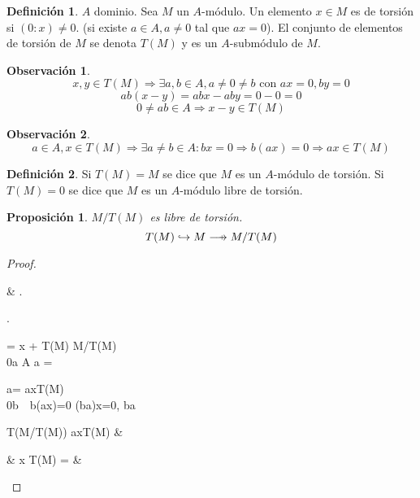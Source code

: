 \documentclass{article}
\def\flechaSobreyectiva{\mathrel{\mkern16mu  \vcenter{\hbox{$\scriptscriptstyle+$}}%
		\mkern-25mu{\longrightarrow}}}
\newenvironment{rcases}
{\left.\begin{aligned}}
	{\end{aligned}\right\rbrace}
\theoremstyle{theorem-style}  %
\newtheorem{proposition}[theorem]{Proposición}
\theoremstyle{definition}
\newtheorem{definition}{Definición}[section]
\newtheorem*{observation}{Observación} %
\theoremstyle{example-style}
\begin{document}
	\begin{definition}
		$ A $ dominio. Sea $ M$ un $ A $-módulo. Un elemento $ x\in M $ es de torsión si $ (0:x)\neq 0 $.
		(si existe $ a\in A, a \neq 0 $ tal que $ ax=0 $).
		El conjunto de elementos de torsión de $ M $ se denota $ T(M) $ y es un $ A $-submódulo de $ M $.
	\end{definition}

	\begin{observation}
		\[x,y\in T(M) \Rightarrow \exists a,b \in A, a\neq 0\neq b \text{ con } ax=0, by=0\]
		\[ ab(x-y)=abx-aby=0-0=0\]
		\[0\neq ab \in A \Rightarrow x-y \in T(M)\]
	\end{observation}

	\begin{observation}
	\[ a \in A, x \in T(M) \Rightarrow \exists a\neq b \in A : bx=0 \Rightarrow b(ax)=0 \Rightarrow ax \in T(M) \]
	\end{observation}

	\begin{definition}
		Si $ T(M)=M $ se dice que $ M $ es un $ A $-módulo de torsión. Si $ T(M)=0 $ se dice que $ M $ es un $ A $-módulo libre de torsión.
	\end{definition}

	\begin{proposition}
		$M/T(M)$ es libre de torsión.
		\[  T(M) \hookrightarrow M \flechaSobreyectiva M/T(M)  \]
	\end{proposition}

	\begin{proof}
		\begin{flalign*}
		& \begin{rcases}
			\begin{rcases}
			 = x + T(M) \in M/T(M) \\
			0\neq a \in A \quad a \cdot {} = 
			\end{rcases}\Rightarrow
		 a\cdot{}=  \Leftrightarrow ax\in T(M) \\
		 0\neq b\ \  b(ax)=0 \Leftrightarrow (ba)x=0, ba
 		\end{rcases}
			\Rightarrow {} \in T(M/T(M)) \Leftrightarrow ax\in T(M) &
		\end{flalign*}
		\begin{flalign*}
		& \Leftrightarrow  x \in T(M) \Leftrightarrow {}=\overline{0} &
		\end{flalign*}
	\end{proof}
\end{document}
